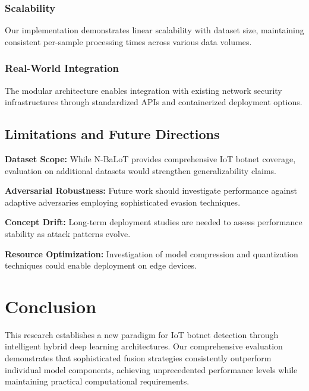 \documentclass[conference]{IEEEtran}
\begin{document}
\subsubsection{Scalability}
Our implementation demonstrates linear scalability with dataset size, maintaining consistent per-sample processing times across various data volumes.

\subsubsection{Real-World Integration}
The modular architecture enables integration with existing network security infrastructures through standardized APIs and containerized deployment options.

\subsection{Limitations and Future Directions}

\textbf{Dataset Scope:} While N-BaLoT provides comprehensive IoT botnet coverage, evaluation on additional datasets would strengthen generalizability claims.

\textbf{Adversarial Robustness:} Future work should investigate performance against adaptive adversaries employing sophisticated evasion techniques.

\textbf{Concept Drift:} Long-term deployment studies are needed to assess performance stability as attack patterns evolve.

\textbf{Resource Optimization:} Investigation of model compression and quantization techniques could enable deployment on edge devices.

\section{Conclusion}

This research establishes a new paradigm for IoT botnet detection through intelligent hybrid deep learning architectures. Our comprehensive evaluation demonstrates that sophisticated fusion strategies consistently outperform individual model components, achieving unprecedented performance levels while maintaining practical computational requirements.
\end{document}
